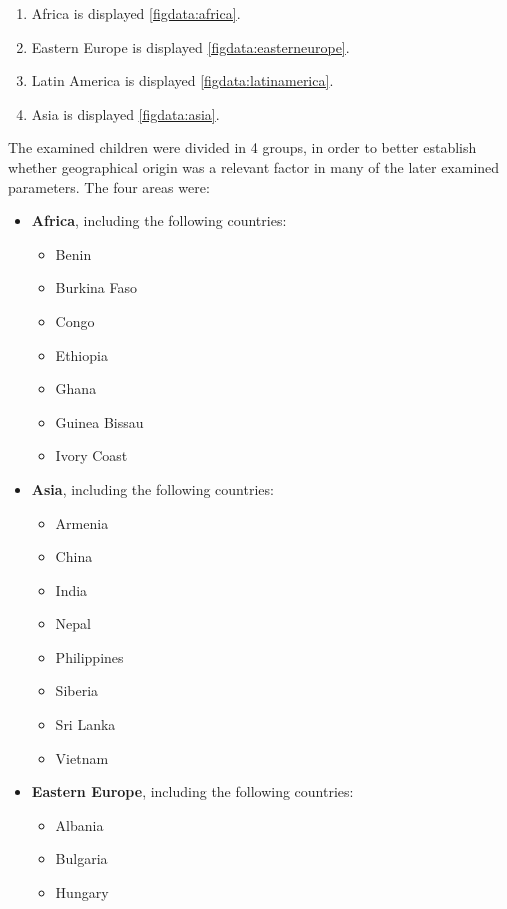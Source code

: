 \begin{enumerate}
	\item Africa is displayed \ref{figdata:africa}.
	\item Eastern Europe is displayed \ref{figdata:easterneurope}.
	\item Latin America is displayed \ref{figdata:latinamerica}.
	\item Asia is displayed \ref{figdata:asia}.
\end{enumerate}


The examined children were divided in 4 groups, in order to better establish whether geographical origin was a relevant factor in many of the later examined parameters. The four areas were:

\begin{itemize}
    \item \textbf{Africa}, including the following countries:
    		\begin{itemize}
    			\item Benin
    			\item Burkina Faso
    			\item Congo
    			\item Ethiopia
    			\item Ghana
    			\item Guinea Bissau
    			\item Ivory Coast
    		\end{itemize}
    \item \textbf{Asia}, including the following countries:
    		\begin{itemize}
    			\item Armenia
    			\item China
    			\item India
    			\item Nepal
    			\item Philippines
    			\item Siberia
    			\item Sri Lanka
    			\item Vietnam
    		\end{itemize}
    \item \textbf{Eastern Europe}, including the following countries:
    		\begin{itemize}
    			\item Albania
    			\item Bulgaria
    			\item Hungary

\end{itemize}
\end{itemize}

